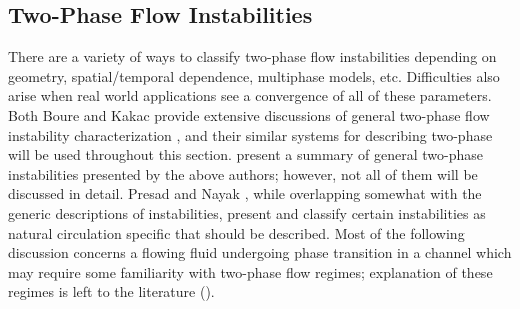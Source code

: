 \subsection{Two-Phase Flow Instabilities}
There are a variety of ways to classify two-phase flow instabilities depending on geometry, spatial/temporal dependence, multiphase models, etc.
Difficulties also arise when real world applications see a convergence of all of these parameters.
Both Boure \etal and Kakac \etal provide extensive discussions of general two-phase flow instability characterization \cite{boure_review_1973,kakac_review_2008}, and their similar systems for describing two-phase will be used throughout this section.
 present a summary of general two-phase instabilities presented by the above authors; however, not all of them will be discussed in detail.
Presad \etal \cite{durga_prasad_review_2007} and Nayak \etal \cite{nayak_flow_2008}, while overlapping somewhat with the generic descriptions of instabilities, present and classify certain instabilities as natural circulation specific that should be described.
Most of the following discussion concerns a flowing fluid undergoing phase transition in a channel which may require some familiarity with two-phase flow regimes; explanation of these regimes is left to the literature (\eg \cite{thome_chapter_2004,tong_boiling_1997,ghiaasiaan_two-phase_2007}).


